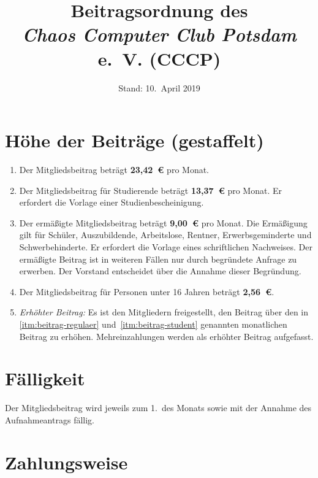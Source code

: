 \documentclass[a4paper, 10pt, headings=normal]{scrartcl}
\title{Beitragsordnung des \\ \emph{Chaos Computer Club Potsdam} e.~V. (CCCP)}
\author{Stand: 10.~April 2019}%
\date{}
\begin{document}
\maketitle
\pagestyle{myheadings}

\begin{multicols*}{2}

\section{Höhe der Beiträge (gestaffelt)}

\begin{enumerate}[label={(\arabic*)}]
	\item
		\label{itm:beitrag-regulaer}
		Der Mitgliedsbeitrag beträgt \textbf{23,42~€} pro Monat.
	\item
		\label{itm:beitrag-student}
		Der Mitgliedsbeitrag für Studierende beträgt \textbf{13,37~€} pro Monat.
		Er erfordert die Vorlage einer Studienbescheinigung.
	\item
		Der ermäßigte Mitgliedsbeitrag beträgt \textbf{9,00~€} pro Monat.
		Die Ermäßigung gilt für Schüler, Auszubildende, Arbeitslose, Rentner, Erwerbsgeminderte und Schwerbehinderte.
		Er erfordert die Vorlage eines schriftlichen Nachweises.
		Der ermäßigte Beitrag ist in weiteren Fällen nur durch begründete Anfrage zu erwerben.
		Der Vorstand entscheidet über die Annahme dieser Begründung.
	\item
		Der Mitgliedsbeitrag für Personen unter 16 Jahren beträgt \textbf{2,56~€}.
	\item
		\emph{Erhöhter Beitrag:} Es ist den Mitgliedern freigestellt, den Beitrag über den in \ref{itm:beitrag-regulaer} und~\ref{itm:beitrag-student} genannten monatlichen Beitrag zu erhöhen.
		Mehreinzahlungen werden als erhöhter Beitrag aufgefasst.
\end{enumerate}

\section{Fälligkeit}

Der Mitgliedsbeitrag wird jeweils zum 1.~des Monats sowie mit der Annahme des Aufnahmeantrags fällig.

\section{Zahlungsweise}


\end{multicols*}
\end{document}
